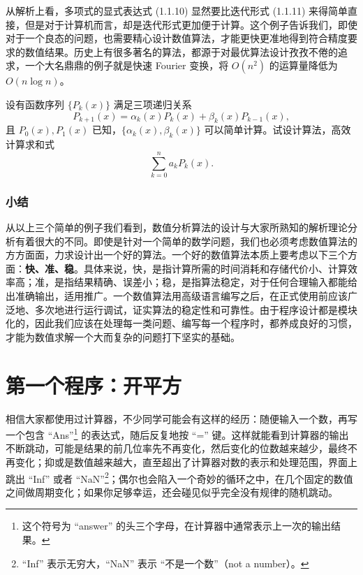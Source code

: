 从解析上看，多项式的显式表达式 (1.1.10) 显然要比迭代形式 (1.1.11) 来得简单直接，但是对于计算机而言，却是迭代形式更加便于计算。这个例子告诉我们，即使对于一个良态的问题，也需要精心设计数值算法，才能更快更准地得到符合精度要求的数值结果。历史上有很多著名的算法，都源于对最优算法设计孜孜不倦的追求，一个大名鼎鼎的例子就是快速 Fourier 变换，将 $O(n^2)$ 的运算量降低为 $O(n\log n)$。

\begin{exerciseBox}[练习 1.3]
设有函数序列 $\{P_k(x)\}$ 满足三项递归关系
\[
P_{k+1}(x)=\alpha_k(x)P_k(x)+\beta_k(x)P_{k-1}(x),
\]
且 $P_0(x),P_1(x)$ 已知，$\{\alpha_k(x),\beta_k(x)\}$ 可以简单计算。试设计算法，高效计算求和式
\begin{equation}
\sum_{k=0}^{n}a_kP_k(x).
\tag{1.1.12}
\end{equation}
\end{exerciseBox}


\subsubsection{小结}

从以上三个简单的例子我们看到，数值分析算法的设计与大家所熟知的解析理论分析有着很大的不同。即使是针对一个简单的数学问题，我们也必须考虑数值算法的方方面面，力求设计出一个好的算法。一个好的数值算法本质上要考虑以下三个方面：\textbf{快、准、稳}。具体来说，快，是指计算所需的时间消耗和存储代价小、计算效率高；准，是指结果精确、误差小；稳，是指算法稳定，对于任何合理输入都能给出准确输出，适用推广。一个数值算法用高级语言编写之后，在正式使用前应该广泛地、多次地进行运行调试，证实算法的稳定性和可靠性。由于程序设计都是模块化的，因此我们应该在处理每一类问题、编写每一个程序时，都养成良好的习惯，才能为数值求解一个大而复杂的问题打下坚实的基础。

\section{第一个程序：开平方}

相信大家都使用过计算器，不少同学可能会有这样的经历：随便输入一个数，再写一个包含 ``Ans''\footnote{这个符号为 ``answer'' 的头三个字母，在计算器中通常表示上一次的输出结果。} 的表达式，随后反复地按 ``='' 键。这样就能看到计算器的输出不断跳动，可能是结果的前几位率先不再变化，然后变化的位数越来越少，最终不再变化；抑或是数值越来越大，直至超出了计算器对数的表示和处理范围，界面上跳出 ``Inf'' 或者 ``NaN''\footnote{``Inf'' 表示无穷大，``NaN'' 表示 ``不是一个数''（not a number）。}；偶尔也会陷入一个奇妙的循环之中，在几个固定的数值之间做周期变化；如果你足够幸运，还会碰见似乎完全没有规律的随机跳动。

